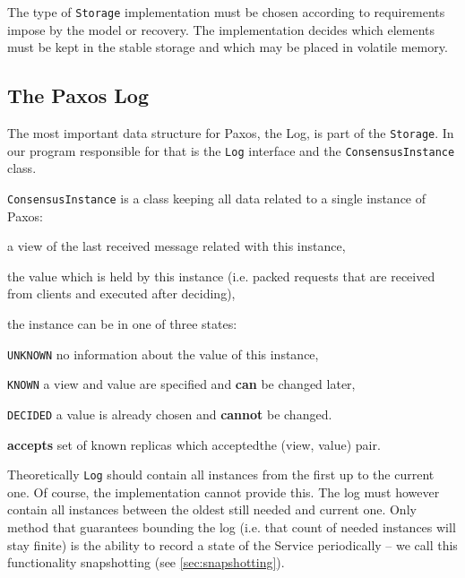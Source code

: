 \strut

The type of \texttt{Storage} implementation must be chosen according to requirements impose by the model or recovery.
The implementation decides which elements must be kept in the stable storage and which may be placed in volatile memory.

\subsection{The Paxos Log}
\label{subsec:the_paxos_log}
The most important data structure for Paxos, the Log, is part of the \texttt{Storage}.
In our program responsible for that is the \texttt{Log} interface and the \texttt{Con\-sen\-susInstance} class.

\texttt{ConsensusInstance} is a class keeping all data related to a single instance of Paxos: %
\begin{tightList}[\setlength{\itemindent}{0pt}\setlength{\leftmargin}{2\leftmargin}]
  \end{tightList}
  \item[\textbf{view}] a view of the last received message related with this instance,
  \item[\textbf{value}] the value which is held by this instance (i.e. packed requests that are received from clients and executed after deciding), %
  \item[\textbf{state}] the instance can be in one of three states:
  \begin{tightList}[\setlength{\itemindent}{0pt} \setlength{\labelwidth}{7em}]
    \item[\texttt{\tiny UNKNOWN}] no information about the value of this instance,
    \item[\texttt{\tiny KNOWN}] a view and value are specified and \textbf{can} be changed later,
    \item[\texttt{\tiny DECIDED}] a value is already chosen and \textbf{cannot} be changed.
  \item[\textbf{accepts}] set of known replicas which acceptedthe (view, value) pair.
\end{tightList}

Theoretically \texttt{Log} should contain all instances from the first up to the current one. Of course, the implementation cannot provide this. The log must however contain all instances between the oldest still needed and current one. Only method that guarantees bounding the log (i.e. that count of needed instances will stay finite) is the ability to record a state of the Service periodically -- we call this functionality snapshotting (see \ref{sec:snapshotting}). %

